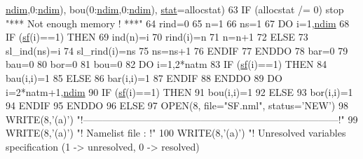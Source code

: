 \begin{DoxyCode}
      \hyperlink{namespaceparams_a2323fe1773f086e20c14f266351c482b}{ndim},0:\hyperlink{namespaceparams_a2323fe1773f086e20c14f266351c482b}{ndim}), bou(0:\hyperlink{namespaceparams_a2323fe1773f086e20c14f266351c482b}{ndim},0:\hyperlink{namespaceparams_a2323fe1773f086e20c14f266351c482b}{ndim}), \hyperlink{namespacestat}{stat}=allocstat)
63        \textcolor{keywordflow}{IF} (allocstat /= 0) stop \textcolor{stringliteral}{"*** Not enough memory ! ***"}
64        rind=0
65        n=1
66        ns=1
67        \textcolor{keywordflow}{DO} i=1,\hyperlink{namespaceparams_a2323fe1773f086e20c14f266351c482b}{ndim}
68           \textcolor{keywordflow}{IF} (\hyperlink{namespacesf__def_ad000452ff3b9c4c5ce070c04d0521b52}{sf}(i)==1) \textcolor{keywordflow}{THEN}
69              ind(n)=i
70              rind(i)=n
71              n=n+1
72           \textcolor{keywordflow}{ELSE}
73              sl\_ind(ns)=i
74              sl\_rind(i)=ns
75              ns=ns+1
76 \textcolor{keywordflow}{          ENDIF}
77 \textcolor{keywordflow}{       ENDDO}
78        bar=0
79        bau=0
80        bor=0
81        bou=0
82        \textcolor{keywordflow}{DO} i=1,2*natm
83           \textcolor{keywordflow}{IF} (\hyperlink{namespacesf__def_ad000452ff3b9c4c5ce070c04d0521b52}{sf}(i)==1) \textcolor{keywordflow}{THEN}
84              bau(i,i)=1
85           \textcolor{keywordflow}{ELSE}
86              bar(i,i)=1
87 \textcolor{keywordflow}{          ENDIF}
88 \textcolor{keywordflow}{       ENDDO}
89        \textcolor{keywordflow}{DO} i=2*natm+1,\hyperlink{namespaceparams_a2323fe1773f086e20c14f266351c482b}{ndim}
90           \textcolor{keywordflow}{IF} (\hyperlink{namespacesf__def_ad000452ff3b9c4c5ce070c04d0521b52}{sf}(i)==1) \textcolor{keywordflow}{THEN}
91              bou(i,i)=1
92           \textcolor{keywordflow}{ELSE}
93              bor(i,i)=1
94 \textcolor{keywordflow}{          ENDIF}
95 \textcolor{keywordflow}{       ENDDO}
96     \textcolor{keywordflow}{ELSE}
97        \textcolor{keyword}{OPEN}(8, file=\textcolor{stringliteral}{"SF.nml"}, status=\textcolor{stringliteral}{'NEW'})
98        \textcolor{keyword}{WRITE}(8,\textcolor{stringliteral}{'(a)'}) \textcolor{stringliteral}{"!------------------------------------------------------------------------------!"}
99        \textcolor{keyword}{WRITE}(8,\textcolor{stringliteral}{'(a)'}) \textcolor{stringliteral}{"! Namelist file :                                                              !"}
100        \textcolor{keyword}{WRITE}(8,\textcolor{stringliteral}{'(a)'}) \textcolor{stringliteral}{"! Unresolved variables specification (1 -> unresolved, 0 -> resolved)               
}
\end{DoxyCode}
